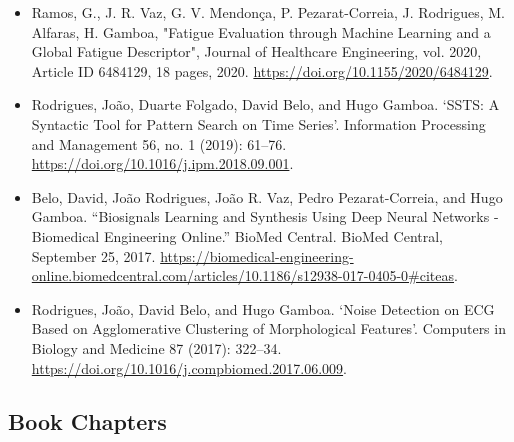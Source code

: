 \begin{itemize}
\item Ramos, G., J. R. Vaz, G. V. Mendonça, P. Pezarat-Correia, J. Rodrigues, M. Alfaras, H. Gamboa, "Fatigue Evaluation through Machine Learning and a Global Fatigue Descriptor", Journal of Healthcare Engineering, vol. 2020, Article ID 6484129, 18 pages, 2020. \url{https://doi.org/10.1155/2020/6484129}.

\item Rodrigues, João, Duarte Folgado, David Belo, and Hugo Gamboa. ‘SSTS: A Syntactic Tool for Pattern Search on Time Series’. Information Processing and Management 56, no. 1 (2019): 61–76. \url{https://doi.org/10.1016/j.ipm.2018.09.001}.

\item Belo, David, João Rodrigues, João R. Vaz, Pedro Pezarat-Correia, and Hugo Gamboa. “Biosignals Learning and Synthesis Using Deep Neural Networks - Biomedical Engineering Online.” BioMed Central. BioMed Central, September 25, 2017. \url{https://biomedical-engineering-online.biomedcentral.com/articles/10.1186/s12938-017-0405-0#citeas}. 

\item Rodrigues, João, David Belo, and Hugo Gamboa. ‘Noise Detection on ECG Based on Agglomerative Clustering of Morphological Features’. Computers in Biology and Medicine 87 (2017): 322–34. \url{https://doi.org/10.1016/j.compbiomed.2017.06.009}.

\end{itemize}

\subsection{Book Chapters}

